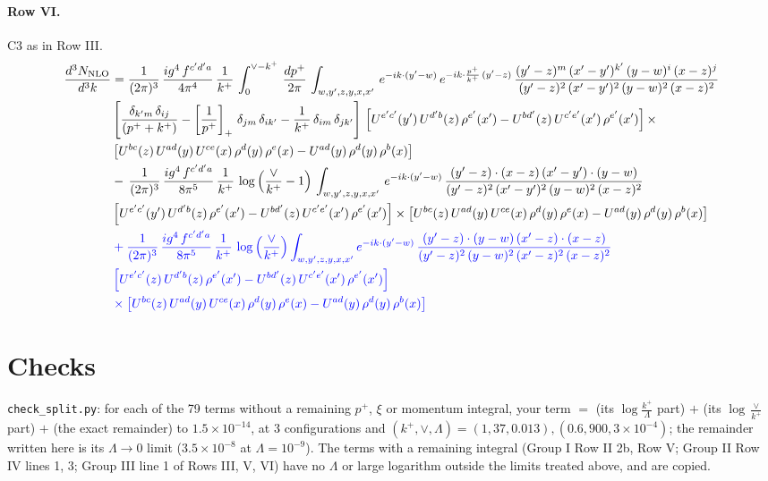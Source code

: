 \documentclass[10pt]{article}
\numberwithin{equation}{section}
\newcommand{\nc}{\color{blue}}
\begin{document}
\paragraph{Row VI.}
C3 as in Row III.
\begin{align}
    \frac{d^{3}N_{\rm NLO}}{d^{3}k} & =  \frac{1}{(2\pi)^{3}}\, \frac{ig^{4}\,f^{c'd'a}}{4\pi^{4}}\, \frac{1}{k^{+}}\,\int_{0}^{\vee-k^{+}}\, \frac{dp^{+}}{2\pi}\, \int_{w,y',z,y,x,x'}\, e^{-ik\cdot (y'-w)}\, e^{-ik\cdot \frac{p^{+}}{k^{+}}\,(y'-z)}\,\frac{(y'-z)^{m}\,(x'-y')^{k'}\,(y-w)^{i}\,(x-z)^{j}}{(y'-z)^{2}\,(x'-y')^{2}\,(y-w)^{2}\,(x-z)^{2}}\notag \\ & \left[\frac{\delta_{k'm}\,\delta_{ij}}{(p^{+}+k^{+})}-\left[\frac{1}{p^{+}}\right]_{+}\,\delta_{jm}\,\delta_{ik'}-\frac{1}{k^{+}}\, \delta_{im}\, \delta_{jk'}\right]\, \left[U^{e'c'}(y')\,U^{d'b}(z)\,\rho^{e'}(x')-U^{bd'}(z)\,U^{c'e'}(x')\,\rho^{e'}(x')\right]\times\notag \\ &  \left[U^{bc}(z)\,U^{ad}(y)\,U^{ce}(x)\,\rho^{d}(y)\,\rho^{e}(x)-U^{ad}(y)\,\rho^{d}(y)\,\rho^{b}(x)\right] \notag \\
&  -\,\frac{1}{(2\pi)^{3}}\, \frac{ig^{4}\,f^{c'd'a}}{8\pi^{5}}\, \frac{1}{k^{+}}\,\log{\left(\frac{\vee}{k^{+}}-1\right)}\, \int_{w,y',z,y,x,x'}\, e^{-ik\cdot (y'-w)}\,\frac{(y'-z)\cdot (x-z)\,(x'-y')\cdot (y-w)}{(y'-z)^{2}\,(x'-y')^{2}\,(y-w)^{2}\,(x-z)^{2}}\notag \\ & \left[U^{e'c'}(y')\,U^{d'b}(z)\,\rho^{e'}(x')-U^{bd'}(z)\,U^{c'e'}(x')\,\rho^{e'}(x')\right]\times  \left[U^{bc}(z)\,U^{ad}(y)\,U^{ce}(x)\,\rho^{d}(y)\,\rho^{e}(x)-U^{ad}(y)\,\rho^{d}(y)\,\rho^{b}(x)\right] \notag \\
& \nc  +\frac{1}{(2\pi)^{3}}\, \frac{ig^{4}\,f^{c'd'a}}{8\pi^{5}}\, \frac{1}{k^{+}}\,\log{\left(\frac{\vee}{k^{+}}\right)}\int_{w,y',z,y,x,x'} e^{-ik\cdot (y'-w)}\,\frac{(y'-z)\cdot (y-w)\,(x'-z)\cdot (x-z)}{(y'-z)^{2}\,(y-w)^{2}\,(x'-z)^{2}\,(x-z)^{2}}\notag \\
& \nc  \left[U^{e'c'}(z)\,U^{d'b}(z)\,\rho^{e'}(x')-U^{bd'}(z)\,U^{c'e'}(x')\,\rho^{e'}(x')\right]\notag \\
& \nc  \times\left[U^{bc}(z)\,U^{ad}(y)\,U^{ce}(x)\,\rho^{d}(y)\,\rho^{e}(x)-U^{ad}(y)\,\rho^{d}(y)\,\rho^{b}(x)\right] \label{eq:F:G3VI}
\end{align}


\section{Checks}\label{sec:checks}
\texttt{check\_split.py}: for each of the 79 terms without a remaining $p^+$, $\xi$ or momentum integral, your term $=$ (its $\log\frac{k^+}{\Lambda}$ part) $+$ (its $\log\frac{\vee}{k^+}$ part) $+$ (the exact remainder) to $1.5\times10^{-14}$, at 3 configurations and $(k^+,\vee,\Lambda)=(1,37,0.013),(0.6,900,3\times10^{-4})$; the remainder written here is its $\Lambda\to0$ limit ($3.5\times10^{-8}$ at $\Lambda=10^{-9}$). The terms with a remaining integral (Group I Row II 2b, Row V; Group II Row IV lines 1, 3; Group III line 1 of Rows III, V, VI) have no $\Lambda$ or large logarithm outside the limits treated above, and are copied.
\end{document}
